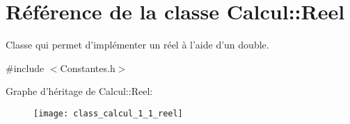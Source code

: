 \hypertarget{class_calcul_1_1_reel}{\section{Référence de la classe Calcul\-:\-:Reel}
\label{class_calcul_1_1_reel}
}


Classe qui permet d'implémenter un réel à l'aide d'un double.  




{\ttfamily \#include $<$Constantes.\-h$>$}

Graphe d'héritage de Calcul\-:\-:Reel\-:\begin{figure}[H]
\begin{center}
\leavevmode
\texttt{[image: class\_calcul\_1\_1\_reel]}
\end{center}
\end{figure}
